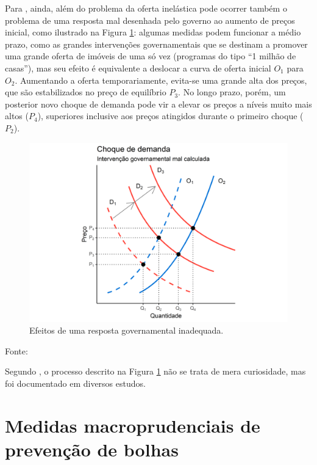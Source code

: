 \documentclass[
	12pt,				%
	oneside,			%
	a4paper,			%
	chapter=TITLE,		%
	section=TITLE,		%
	english,			%
	brazil				%
	]{abntex2}
\newcommand{\bcenter}{\begin{center}}
\newcommand{\ecenter}{\end{center}}
\begin{document}
Para \textcite[p.~11]{regulation}, ainda, além do problema da oferta inelástica pode
ocorrer também o problema de uma resposta mal desenhada pelo governo ao aumento
de preços inicial, como ilustrado na Figura \ref{fig:choque2}: algumas medidas
podem funcionar a médio prazo, como as grandes intervenções governamentais que
se destinam a promover uma grande oferta de imóveis de uma só vez (programas do
tipo ``1 milhão de casas''), mas seu efeito é equivalente a deslocar a curva de
oferta inicial \(O_1\) para \(O_2\). Aumentando a oferta temporariamente, evita-se
uma grande alta dos preços, que são estabilizados no preço de equilíbrio \(P_3\).
No longo prazo, porém, um posterior novo choque de demanda pode vir a elevar os
preços a níveis muito mais altos (\(P_4\)), superiores inclusive aos preços
atingidos durante o primeiro choque (\(P_2\)).
\begin{figure}[H]

{\centering \includegraphics[width=0.7\linewidth]{images/choque2-1} 

}

\caption{Efeitos de uma resposta governamental inadequada.}\label{fig:choque2}
\end{figure}
\bcenter

Fonte: \textcite[p.~11]{regulation}
\ecenter

Segundo \textcite[p.~19]{Malpezzi2002TheRO}, o processo descrito na Figura
\ref{fig:choque2} não se trata de mera curiosidade, mas foi documentado em
diversos estudos.

\hypertarget{medidas-macroprudenciais-de-prevenuxe7uxe3o-de-bolhas}{%
\section{Medidas macroprudenciais de prevenção de bolhas}\label{medidas-macroprudenciais-de-prevenuxe7uxe3o-de-bolhas}}
\end{document}
